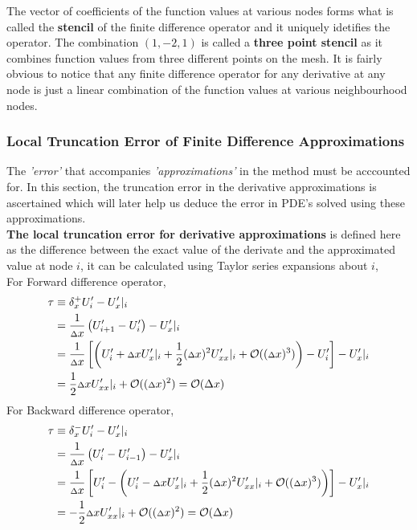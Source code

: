 The vector of coefficients of the function values at various nodes forms what is called the \textbf{stencil} of the finite difference operator and it uniquely idetifies the operator. The combination $(1,-2,1)$ is called a \textbf{three point stencil} as it combines function values from three different points on the mesh.
It is fairly obvious to notice that any finite difference operator for any derivative at any node is just a linear combination of the function values at various neighbourhood nodes.   

\subsubsection{Local Truncation Error of Finite Difference Approximations}
The \textit{'error'} that accompanies \textit{'approximations'} in the method must be acccounted for. In this section, the truncation error in the derivative approximations is ascertained which will later help us deduce the error in PDE's solved using these approximations.
\\[2mm]
\textbf{The local truncation error for derivative approximations} is defined here as the difference between the exact value of the derivate and the approximated value at node $i$, it can be calculated using Taylor series expansions about $i$,\\[2mm]
For Forward difference operator, 
\begin{align*}
    \tau &\equiv \delta _ x^{+} U'_ i - {U'_ x}|_ i \\
    &= \frac{1}{{\scriptstyle \Delta} x}\left( U'_ {i+1} - U'_{i}\right) - {U'_ x}|_i \\
    &= \frac{1}{{\scriptstyle \Delta} x}\left[ \left( U'_ i + {\scriptstyle \Delta} x{U'_ x}|_ i + \frac{1}{2}({\scriptstyle \Delta} x)^2{U'_{xx}}|_ i + \mathcal{O}(({\scriptstyle \Delta} x)^3)\right) - U'_i \right] - {U'_ x}|_ i \\
    &= \frac{1}{2}{\scriptstyle \Delta} x{U'_{xx}}|_ i + \mathcal{O}(({\scriptstyle \Delta} x)^2) = \mathcal{O}(\Delta x)
\end{align*}
For Backward difference operator, 
\begin{align*}
    \tau &\equiv \delta _ x^{-} U'_ i - {U'_ x}|_ i \\
    &= \frac{1}{{\scriptstyle \Delta} x}\left( U'_ i - U'_{i-1}\right) - {U'_ x}|_i \\
    &= \frac{1}{{\scriptstyle \Delta} x}\left[ U'_ i - \left( U'_ i - {\scriptstyle \Delta} x{U'_ x}|_ i + \frac{1}{2}({\scriptstyle \Delta} x)^2{U'_{xx}}|_ i + \mathcal{O}(({\scriptstyle \Delta} x)^3)\right)\right] - {U'_ x}|_ i \\
    &= -\frac{1}{2}{\scriptstyle \Delta} x{U'_{xx}}|_ i + \mathcal{O}(({\scriptstyle \Delta} x)^2) = \mathcal{O}(\Delta x)  
\end{align*}
